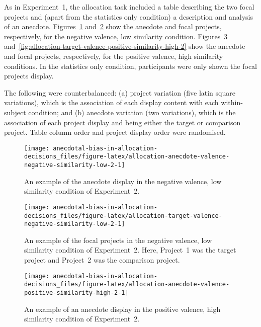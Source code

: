 \documentclass[
  man, donotrepeattitle,floatsintext]{apa7}
\theoremstyle{definition}
\theoremstyle{definition}
\theoremstyle{definition}
\theoremstyle{definition}
\theoremstyle{remark}
\begin{document}
As in Experiment~1, the allocation task included a table describing the two
focal projects and (apart from the statistics only condition) a description and
analysis of an anecdote.
Figures~\ref{fig:allocation-anecdote-valence-negative-similarity-low-2}
and~\ref{fig:allocation-target-valence-negative-similarity-low-2}
show the anecdote and focal projects, respectively, for the negative valence,
low similarity condition.
Figures~\ref{fig:allocation-anecdote-valence-positive-similarity-high-2}
and~\ref{fig:allocation-target-valence-positive-similarity-high-2}
show the anecdote and focal projects, respectively, for the positive valence,
high similarity conditions. In the statistics only condition, participants were
only shown the focal projects display.

The following were counterbalanced: (a) project variation (five latin square
variations), which is the association of each display content with each
within-subject condition; and (b) anecdote variation (two variations), which is
the association of each project display and being either the target or
comparison project. Table column order and project display order were
randomised.



\begin{figure}
\texttt{[image: anecdotal-bias-in-allocation-decisions\_files/figure-latex/allocation-anecdote-valence-negative-similarity-low-2-1]} \caption{An example of the anecdote display in the negative valence, low similarity condition of Experiment~2.}\label{fig:allocation-anecdote-valence-negative-similarity-low-2}
\end{figure}



\begin{figure}
\texttt{[image: anecdotal-bias-in-allocation-decisions\_files/figure-latex/allocation-target-valence-negative-similarity-low-2-1]} \caption{An example of the focal projects in the negative valence, low similarity condition of Experiment~2. Here, Project~1 was the target project and Project~2 was the comparison project.}\label{fig:allocation-target-valence-negative-similarity-low-2}
\end{figure}



\begin{figure}
\texttt{[image: anecdotal-bias-in-allocation-decisions\_files/figure-latex/allocation-anecdote-valence-positive-similarity-high-2-1]} \caption{An example of an anecdote display in the positive valence, high similarity condition of Experiment~2.}\label{fig:allocation-anecdote-valence-positive-similarity-high-2}
\end{figure}
\end{document}
